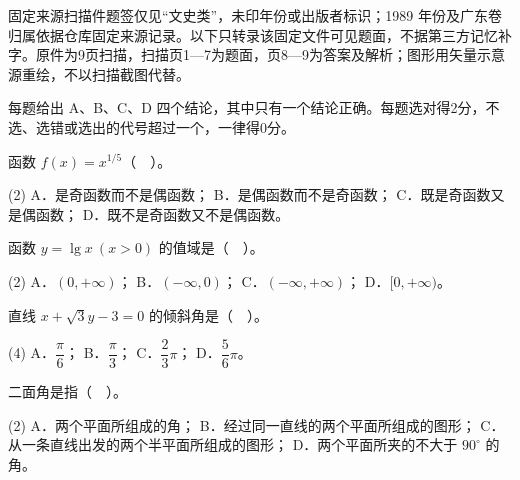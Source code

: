 

\begin{gktip}
固定来源扫描件题签仅见“文史类”，未印年份或出版者标识；1989 年份及广东卷归属依据仓库固定来源记录。以下只转录该固定文件可见题面，不据第三方记忆补字。原件为9页扫描，扫描页1—7为题面，页8—9为答案及解析；图形用矢量示意源重绘，不以扫描截图代替。
\end{gktip}


每题给出 A、B、C、D 四个结论，其中只有一个结论正确。每题选对得2分，不选、选错或选出的代号超过一个，一律得0分。

\begin{question}
函数 $f(x)=x^{1/5}$（　）。

\begin{gkopts}(2)
\task A．是奇函数而不是偶函数；
\task B．是偶函数而不是奇函数；
\task C．既是奇函数又是偶函数；
\task D．既不是奇函数又不是偶函数。
\end{gkopts}

\end{question}
\begin{question}
函数 $y=\lg x\ (x>0)$ 的值域是（　）。

\begin{gkopts}(2)
\task A．$(0,+\infty)$；
\task B．$(-\infty,0)$；
\task C．$(-\infty,+\infty)$；
\task D．$[0,+\infty)$。
\end{gkopts}

\end{question}
\begin{question}
直线 $x+\sqrt3y-3=0$ 的倾斜角是（　）。

\begin{gkopts}(4)
\task A．$\dfrac\pi6$；
\task B．$\dfrac\pi3$；
\task C．$\dfrac23\pi$；
\task D．$\dfrac56\pi$。
\end{gkopts}

\end{question}
\begin{question}
二面角是指（　）。

\begin{gkopts}(2)
\task A．两个平面所组成的角；
\task B．经过同一直线的两个平面所组成的图形；
\task C．从一条直线出发的两个半平面所组成的图形；
\task D．两个平面所夹的不大于 $90^\circ$ 的角。
\end{gkopts}

\end{question}
